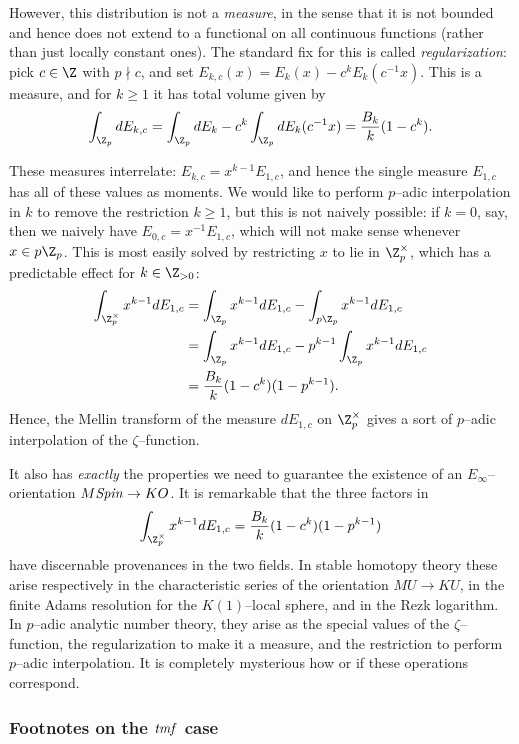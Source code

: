However, this distribution is not a \emph{measure}, in the sense that it is not bounded and hence does not extend to a functional on all continuous functions (rather than just locally constant ones).  The standard fix for this is called \textit{regularization}: pick $c \in \Z$ with $p \nmid c$, and set $E_{k,c}(x) = E_k(x) - c^kE_k(c^{-1}x)$.  This is a measure, and for $k \ge 1$ it has total volume given by \[\int_{\Z_p} dE_{k,c} = \int_{\Z_p} dE_k - c^k \int_{\Z_p} dE_k(c^{-1}x) = \frac{B_k}{k}(1 - c^k).\]

These measures interrelate: $E_{k, c} = x^{k-1} E_{1, c}$, and hence the single measure $E_{1, c}$ has all of these values as moments.  We would like to perform $p$--adic interpolation in $k$ to remove the restriction $k \ge 1$, but this is not naively possible: if $k = 0$, say, then we naively have $E_{0, c} = x^{-1} E_{1, c}$, which will not make sense whenever $x \in p\Z_p$.  This is most easily solved by restricting $x$ to lie in $\Z_p^\times$, which has a predictable effect for $k \in \Z_{> 0}$:
\begin{align*}
\int_{\Z_p^\times} x^{k-1} dE_{1,c} & = \int_{\Z_p} x^{k-1} dE_{1,c} - \int_{p\Z_p} x^{k-1} dE_{1, c} \\
& = \int_{\Z_p} x^{k-1} dE_{1,c} - p^{k-1} \int_{\Z_p} x^{k-1} dE_{1, c} \\
& = \frac{B_k}{k}(1 - c^k)(1 - p^{k-1}).
\end{align*}
Hence, the Mellin transform of the measure $dE_{1,c}$ on $\Z_p^\times$ gives a sort of $p$--adic interpolation of the $\zeta$--function.

It also has \emph{exactly} the properties we need to guarantee the existence of an $E_\infty$--orientation $M\mathit{Spin} \to KO$.  It is remarkable that the three factors in \[\int_{\Z_p^\times} x^{k-1} d E_{1, c} = \frac{B_k}{k} (1 - c^k)(1 - p^{k-1})\] have discernable provenances in the two fields.  In stable homotopy theory these arise respectively in the characteristic series of the orientation $MU \to KU$, in the finite Adams resolution for the $K(1)$--local sphere, and in the Rezk logarithm.  In $p$--adic analytic number theory, they arise as the special values of the $\zeta$--function, the regularization to make it a measure, and the restriction to perform $p$--adic interpolation.  It is completely mysterious how or if these operations correspond.


\subsubsection{Footnotes on the $\mathit{tmf}$ case}

